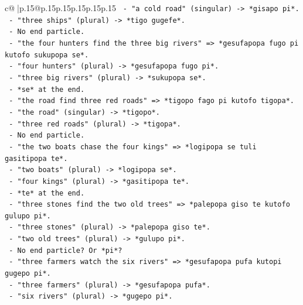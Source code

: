 \documentclass{article}
\begin{document}
{\begin{supertabular}{c@{$\;$}|p{.15\linewidth}@{}p{.15\linewidth}p{.15\linewidth}p{.15\linewidth}p{.15\linewidth}p{.15\linewidth}}
{{{\texttt{                  {-} "a cold road" (singular) {-}> *gisapo pi*.} \\
\texttt{                  {-} "three ships" (plural) {-}> *tigo gugefe*.} \\
\texttt{                  {-} No end particle.} \\
\texttt{                {-} "the four hunters find the three big rivers" => *gesufapopa fugo pi kutofo sukupopa se*.} \\
\texttt{                  {-} "four hunters" (plural) {-}> *gesufapopa fugo pi*.} \\
\texttt{                  {-} "three big rivers" (plural) {-}> *sukupopa se*.} \\
\texttt{                  {-} *se* at the end.} \\
\texttt{                {-} "the road find three red roads" => *tigopo fago pi kutofo tigopa*.} \\
\texttt{                  {-} "the road" (singular) {-}> *tigopo*.} \\
\texttt{                  {-} "three red roads" (plural) {-}> *tigopa*.} \\
\texttt{                  {-} No end particle.} \\
\texttt{                {-} "the two boats chase the four kings" => *logipopa se tuli gasitipopa te*.} \\
\texttt{                  {-} "two boats" (plural) {-}> *logipopa se*.} \\
\texttt{                  {-} "four kings" (plural) {-}> *gasitipopa te*.} \\
\texttt{                  {-} *te* at the end.} \\
\texttt{                {-} "three stones find the two old trees" => *palepopa giso te kutofo gulupo pi*.} \\
\texttt{                  {-} "three stones" (plural) {-}> *palepopa giso te*.} \\
\texttt{                  {-} "two old trees" (plural) {-}> *gulupo pi*.} \\
\texttt{                  {-} No end particle? Or *pi*?} \\
\texttt{                {-} "three farmers watch the six rivers" => *gesufapopa pufa kutopi gugepo pi*.} \\
\texttt{                  {-} "three farmers" (plural) {-}> *gesufapopa pufa*.} \\
\texttt{                  {-} "six rivers" (plural) {-}> *gugepo pi*.} \\
}}}
\end{supertabular}}
\end{document}

